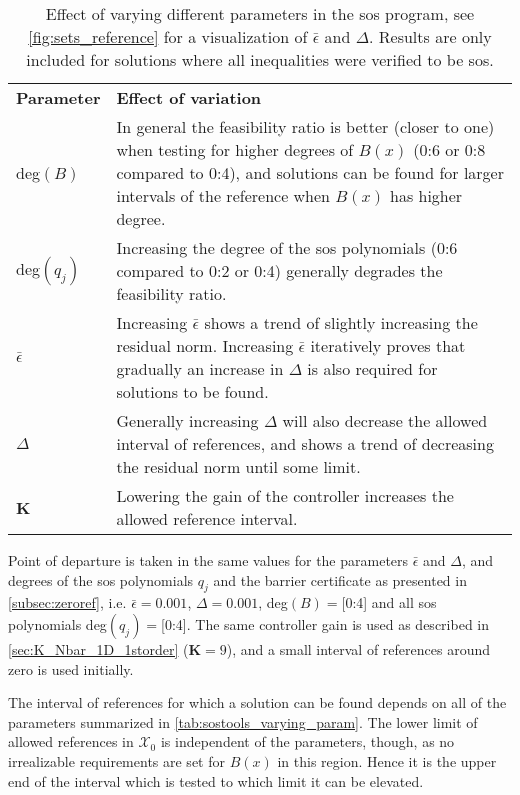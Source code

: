 \begin{table}[htbp]
\begin{tabularx}{\textwidth}{l X}
\rowcolor{HeaderBlue}
\textbf{Parameter} & \textbf{Effect of variation}\\
deg$(B)$ & In general the feasibility ratio is better (closer to one) when testing for higher degrees of $B(x)$ (0:6 or 0:8 compared to 0:4), and solutions can be found for larger intervals of the reference when $B(x)$ has higher degree.\\
\rowcolor{textBlue}
deg$(q_j)$ & Increasing the degree of the \gls{sos} polynomials (0:6 compared to 0:2 or 0:4) generally degrades the feasibility ratio.\\
$\bar{\epsilon}$ & Increasing $\bar{\epsilon}$ shows a trend of slightly increasing the residual norm. Increasing $\bar{\epsilon}$ iteratively proves that gradually an increase in $\Delta$ is also required for solutions to be found. \\
\rowcolor{textBlue}
$\Delta$ & Generally increasing $\Delta$ will also decrease the allowed interval of references, and shows a trend of decreasing the residual norm until some limit.\\
\textbf{K} & Lowering the gain of the controller increases  the allowed reference interval.
\end{tabularx}
\caption{Effect of varying different parameters in the \gls{sos} program, see \autoref{fig:sets_reference} for a visualization of $\bar{\epsilon}$ and $\Delta$. Results are only included for solutions where all inequalities were verified to be \gls{sos}.}
\label{tab:sostools_varying_param}
\end{table}


Point of departure is taken in the same values for the parameters $\bar{\epsilon}$ and $\Delta$, and degrees of the \gls{sos} polynomials $q_j$ and the barrier certificate as presented in \autoref{subsec:zeroref}, i.e. $\bar{\epsilon}=0.001$, $\Delta=0.001$, deg$(B)=$[0:4] and all \gls{sos} polynomials deg$(q_j)=$[0:4]. The same controller gain is used as described in \autoref{sec:K_Nbar_1D_1storder} ($\textbf{K}=9$), and a small interval of references around zero is used initially.

The interval of references for which a solution can be found depends on all of the parameters summarized in \autoref{tab:sostools_varying_param}. The lower limit of allowed references in $\mathcal{X}_0$ is independent of the parameters, though,  as no irrealizable requirements are set for $B(x)$ in this region. Hence it is the upper  end of the interval which is tested to which limit it can be elevated.




